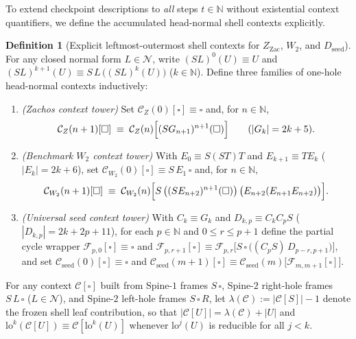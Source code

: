 \documentclass[11pt,reqno]{amsart}
\numberwithin{equation}{section}
\theoremstyle{plain}
\theoremstyle{definition}
\newtheorem{definition}[theorem]{Definition}
\theoremstyle{remark}
\begin{document}
To extend checkpoint descriptions to \emph{all} steps $t \in \mathbb{N}$ without existential context quantifiers, we define the accumulated head-normal shell contexts explicitly.

\begin{definition}[Explicit leftmost-outermost shell contexts for $Z_{\mathrm{Zac}}$, $W_2$, and $D_{\mathrm{seed}}$]
\label{def:lo-explicit-contexts}
For any closed normal form $L \in \mathcal{N}$, write $(S L)^0(U) \equiv U$ and $(S L)^{k+1}(U) \equiv S\,L\,\bigl((S L)^k(U)\bigr)$ ($k \in \mathbb{N}$). Define three families of one-hole head-normal contexts inductively:
\begin{enumerate}[label=(\roman*),leftmargin=2.2em]
\item \emph{(Zachos context tower)} Set $\mathcal{C}_Z(0)[\square] \equiv \square$ and, for $n \in \mathbb{N}$,
\[
\mathcal{C}_Z(n+1)[\square] \;\equiv\; \mathcal{C}_Z(n)\Bigl[(S G_{n+1})^{n+1}(\square)\Bigr]
\qquad (|G_k| = 2k + 5).
\]
\item \emph{(Benchmark $W_2$ context tower)} With $E_0 \equiv S(S T)T$ and $E_{k+1} \equiv T E_k$ ($|E_k| = 2k + 6$), set $\mathcal{C}_{W_2}(0)[\square] \equiv S\,E_1\,\square$ and, for $n \in \mathbb{N}$,
\[
\mathcal{C}_{W_2}(n+1)[\square] \;\equiv\; \mathcal{C}_{W_2}(n)\Bigl[S\,\bigl((S E_{n+2})^{n+1}(\square)\bigr)\,\bigl(E_{n+2}(E_{n+1} E_{n+2})\bigr)\Bigr].
\]
\item \emph{(Universal seed context tower)} With $C_k \equiv G_k$ and $D_{k,p} \equiv C_k C_p S$ ($|D_{k,p}| = 2k + 2p + 11$), for each $p \in \mathbb{N}$ and $0 \le r \le p + 1$ define the partial cycle wrapper $\mathcal{F}_{p,0}[\square] \equiv \square$ and $\mathcal{F}_{p, r+1}[\square] \equiv \mathcal{F}_{p,r}\bigl[S\,\square\,\bigl((C_p S)\,D_{p-r, p+1}\bigr)\bigr]$, and set $\mathcal{C}_{\mathrm{seed}}(0)[\square] \equiv \square$ and $\mathcal{C}_{\mathrm{seed}}(m+1)[\square] \equiv \mathcal{C}_{\mathrm{seed}}(m)\bigl[\mathcal{F}_{m, m+1}[\square]\bigr]$.
\end{enumerate}
For any context $\mathcal{C}[\square]$ built from Spine-$1$ frames $S\,\square$, Spine-$2$ right-hole frames $S\,L\,\square$ ($L \in \mathcal{N}$), and Spine-$2$ left-hole frames $S\,\square\,R$, let $\lambda(\mathcal{C}) := |\mathcal{C}[S]| - 1$ denote the frozen shell leaf contribution, so that $|\mathcal{C}[U]| = \lambda(\mathcal{C}) + |U|$ and $\mathrm{lo}^k(\mathcal{C}[U]) \equiv \mathcal{C}[\mathrm{lo}^k(U)]$ whenever $\mathrm{lo}^j(U)$ is reducible for all $j < k$.
\end{definition}
\end{document}
